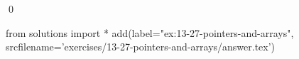 
\begin{ex}
  \label{ex:13-27-pointers-and-arrays}
  
  \qed
\end{ex}
\begin{python0}
from solutions import *
add(label="ex:13-27-pointers-and-arrays",
    srcfilename='exercises/13-27-pointers-and-arrays/answer.tex')
\end{python0}

